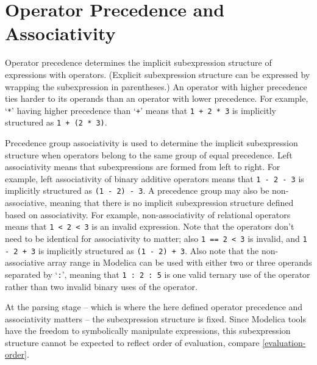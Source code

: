\section{Operator Precedence and Associativity}\label{operator-precedence-and-associativity}

Operator precedence determines the implicit subexpression structure of expressions with operators.
(Explicit subexpression structure can be expressed by wrapping the subexpression in parentheses.)
An operator with higher precedence ties harder to its operands than an operator with lower precedence.
For example, `\lstinline!*!' having higher precedence than `\lstinline!+!' means that \lstinline!1 + 2 * 3! is implicitly structured as \lstinline!1 + (2 * 3)!.

Precedence group associativity is used to determine the implicit subexpression structure when operators belong to the same group of equal precedence.
Left associativity means that subexpressions are formed from left to right.
For example, left associativity of binary additive operators means that \lstinline!1 - 2 - 3! is implicitly structured as \lstinline!(1 - 2) - 3!.
A precedence group may also be non-associative, meaning that there is no implicit subexpression structure defined based on associativity.
For example, non-associativity of relational operators means that \lstinline!1 < 2 < 3! is an invalid expression.
Note that the operators don't need to be identical for associativity to matter; also \lstinline!1 == 2 < 3! is invalid, and \lstinline!1 - 2 + 3! is implicitly structured as \lstinline!(1 - 2) + 3!.
Also note that the non-associative array range in Modelica can be used with either two or three operands separated by `\lstinline!:!', meaning that \lstinline!1 : 2 : 5! is one valid ternary use of the operator rather than two invalid binary uses of the operator.

At the parsing stage -- which is where the here defined operator precedence and associativity matters -- the subexpression structure is fixed.
Since Modelica tools have the freedom to symbolically manipulate expressions, this subexpression structure cannot be expected to reflect order of evaluation, compare \cref{evaluation-order}.

